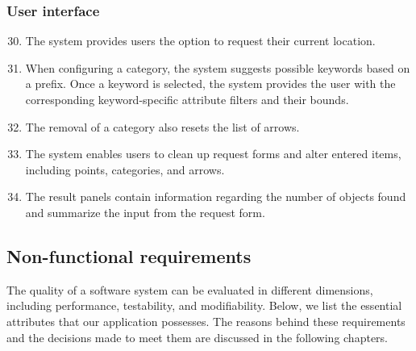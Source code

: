 \subsubsection*{User interface}

\begin{enumerate}[label=\textbf{F\arabic*}]\setcounter{enumi}{29}
\item The system provides users the option to request their current location.
\item When configuring a category, the system suggests possible keywords based on a prefix. Once a keyword is selected, the system provides the user with the corresponding keyword-specific attribute filters and their bounds.
\item The removal of a category also resets the list of arrows.
\item The system enables users to clean up request forms and alter entered items, including points, categories, and arrows.
\item\label{itm:f-search-places-header} The result panels contain information regarding the number of objects found and summarize the input from the request form.
\end{enumerate}

\subsection{Non-functional requirements}\label{sssec:non-functional-requirements}

The quality of a software system can be evaluated in different dimensions, including performance, testability, and modifiability. Below, we list the essential attributes that our application possesses. The reasons behind these requirements and the decisions made to meet them are discussed in the following chapters.

